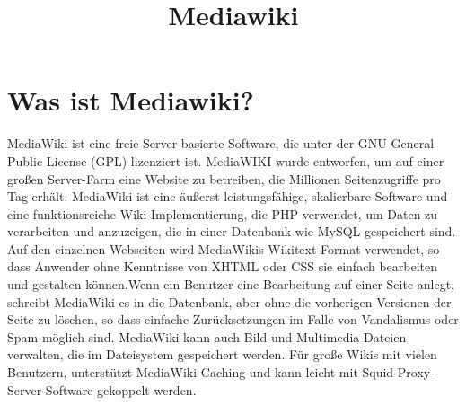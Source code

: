 \documentclass[12pt]{report}
\begin{document}
\title{Mediawiki}
\section{Was ist Mediawiki?}
MediaWiki ist eine freie Server-basierte Software, die unter der GNU General Public License (GPL) lizenziert ist. MediaWIKI wurde entworfen, um auf einer großen Server-Farm eine Website zu betreiben, die Millionen Seitenzugriffe pro Tag erhält. MediaWiki ist eine äußerst leistungsfähige, skalierbare Software und eine funktionsreiche Wiki-Implementierung, die PHP verwendet, um Daten zu verarbeiten und anzuzeigen, die in einer Datenbank wie MySQL gespeichert sind. Auf den einzelnen Webseiten wird MediaWikis Wikitext-Format verwendet, so dass Anwender ohne Kenntnisse von XHTML oder CSS sie einfach bearbeiten und gestalten können.Wenn ein Benutzer eine Bearbeitung auf einer Seite anlegt, schreibt MediaWiki es in die Datenbank, aber ohne die vorherigen Versionen der Seite zu löschen, so dass einfache Zurücksetzungen im Falle von Vandalismus oder Spam möglich sind. MediaWiki kann auch Bild-und Multimedia-Dateien verwalten, die im Dateisystem gespeichert werden. Für große Wikis mit vielen Benutzern, unterstützt MediaWiki Caching und kann leicht mit Squid-Proxy-Server-Software gekoppelt werden.
\end{document}

